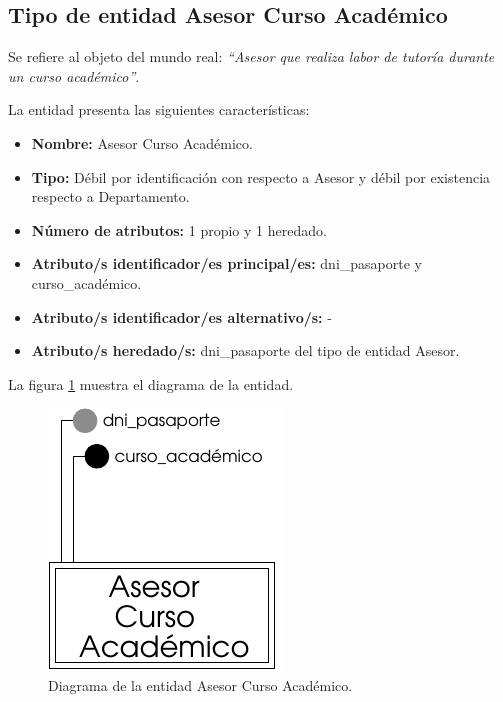 \subsection{Tipo de entidad Asesor Curso Académico}

   \begin{description}

   \item[Definición] Se refiere al objeto del mundo real: \emph{``Asesor
   que realiza labor de tutoría durante un curso académico''}.

   \item[Características] La entidad presenta las siguientes características:
      \begin{itemize}
         \item \textbf{Nombre:} Asesor Curso Académico.
         \item \textbf{Tipo:} Débil por identificación con respecto a Asesor y débil por existencia respecto a Departamento.
         \item \textbf{Número de atributos:} 1 propio y 1 heredado.
         \item \textbf{Atributo/s identificador/es principal/es:} dni\_pasaporte y \\curso\_académico.
         \item \textbf{Atributo/s identificador/es alternativo/s:} -
         \item \textbf{Atributo/s heredado/s:} dni\_pasaporte del tipo
         de entidad Asesor.
      \end{itemize}

   \item[Diagrama] La figura \ref{diagramaAsesorCA} muestra el diagrama de la entidad.
   \item \begin{figure}[!ht]
            \begin{center}
            \includegraphics[]{07.Modelo_Entidad-Interrelacion/7.2.Analisis_Entidades/diagramas/asesorca.pdf}
            \caption{Diagrama de la entidad Asesor Curso Académico.}
            \label{diagramaAsesorCA}
            \end{center}
         \end{figure}


\end{description}
